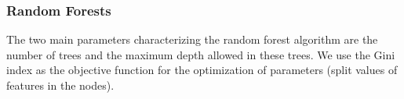 \subsubsection{Random Forests}

The two main parameters characterizing the random forest algorithm are the number of trees and the maximum depth allowed in these trees. 
We use the Gini index as the objective function for the optimization of parameters (split values of features in the nodes).

